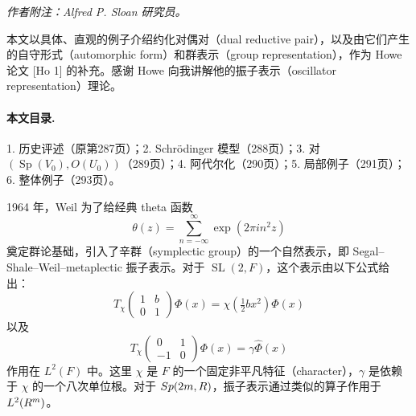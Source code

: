 \noindent\textit{作者附注：Alfred P. Sloan 研究员。}

本文以具体、直观的例子介绍约化对偶对（dual reductive pair），以及由它们产生的自守形式（automorphic form）和群表示（group representation），作为 Howe 论文 [Ho 1] 的补充。感谢 Howe 向我讲解他的振子表示（oscillator representation）理论。

\paragraph*{本文目录.}
1. 历史评述（原第287页）；2. Schrödinger 模型（288页）；3. 对 $(\operatorname{Sp}(V_0),O(U_0))$（289页）；4. 阿代尔化（290页）；5. 局部例子（291页）；6. 整体例子（293页）。

1964 年，Weil 为了给经典 theta 函数
\[
 \theta(z)=\sum_{n=-\infty}^\infty\exp(2\pi i n^2z)
\]
奠定群论基础，引入了辛群（symplectic group）的一个自然表示，即 Segal--Shale--Weil--metaplectic 振子表示。对于 $\operatorname{SL}(2,F)$，这个表示由以下公式给出：
\[
 T_\chi\!\begin{pmatrix}1&b\\0&1\end{pmatrix}\Phi(x)
 =\chi(\tfrac12 bx^2)\Phi(x)
\]
以及
\[
 T_\chi\!\begin{pmatrix}0&1\\-1&0\end{pmatrix}\Phi(x)
 =\gamma\widehat\Phi(x)
\]
作用在 $L^2(F)$ 中。这里 $\chi$ 是 $F$ 的一个固定非平凡特征（character），$\gamma$ 是依赖于 $\chi$ 的一个八次单位根。对于 $Sp(2m,R)$，振子表示通过类似的算子作用于 $L^2(R^m)$。

